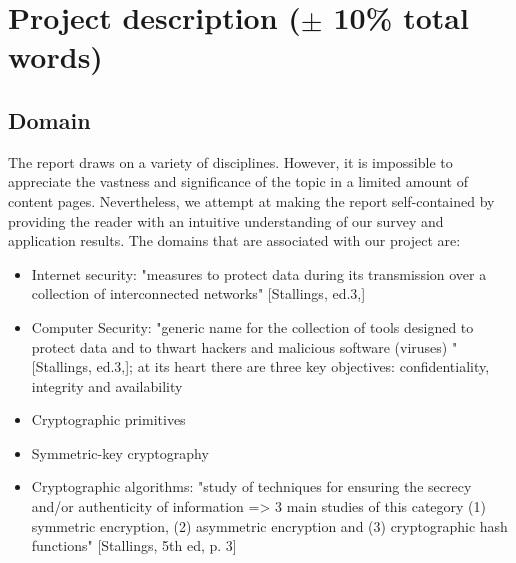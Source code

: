 \section{Project description ($\pm$ 10\% total words) }
\subsection{Domain}
The report draws on a variety of disciplines. However, it is impossible to appreciate the vastness and significance of the topic in a limited amount of content pages. Nevertheless, we attempt at making the report self-contained by providing the reader with an intuitive understanding of our survey and application results.
The domains that are associated with our project are: 
\begin{itemize}
\item Internet security: "measures to protect data during its transmission over a collection of interconnected networks" [Stallings, ed.3,]
\end {itemize}
\begin{itemize} 
\item Computer Security: "generic name for the collection of tools designed to protect data and to thwart hackers and malicious software (viruses) " [Stallings, ed.3,]; at its heart there are three key objectives: confidentiality, integrity and availability
\end{itemize}
\begin{itemize}
\item Cryptographic primitives
\end{itemize}
\begin{itemize}
\item Symmetric-key cryptography
\end{itemize}
\begin{itemize}
\item Cryptographic algorithms: "study of techniques for ensuring the secrecy and/or authenticity of information => 3 main studies of this category (1) symmetric encryption, (2) asymmetric encryption and (3) cryptographic hash functions" [Stallings, 5th ed, p. 3]
\end{itemize}




